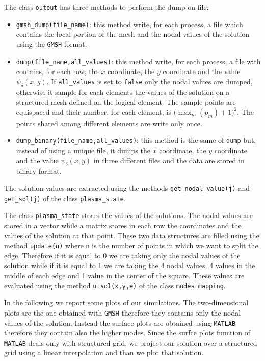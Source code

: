 The class \verb|output| has three methods to perform the dump on file:
\begin{itemize}
  \item \verb|gmsh_dump(file_name)|: this method write, for each process, a file which contains the local portion of the mesh and the nodal values of the solution using the \verb|GMSH| format.
  \item \verb|dump(file_name,all_values)|: this method write, for each process, a file with contains, for each row, the $x$ coordinate, the $y$ coordinate and the value $\psi_{\delta}(x,y)$. If \verb|all_values| is set to \verb|false| only the nodal values are dumped, otherwise it sample for each elements the values of the solution on a structured mesh defined on the logical element. The sample points are equispaced and their number, for each element, is $(\max_m(p_m)+1\big)^2$. The points shared among different elements are write only once.
  \item \verb|dump_binary(file_name,all_values)|: this method is the same of \verb|dump| but, instead of using a unique file, it dumps the $x$ coordinate, the $y$ coordinate and the value $\psi_{\delta}(x,y)$ in three different files and the data are stored in binary format.
\end{itemize}

The solution values are extracted using the methods \verb|get_nodal_value(j)| and \verb|get_sol(j)| of the class \verb|plasma_state|.
\medskip

The class \verb|plasma_state| stores the values of the solutions. The nodal values are stored in a vector while a matrix stores in each row the coordinates and the values of the solution at that point. These two data structures are filled using the method \verb|update(n)| where \verb|n| is the number of points in which we want to split the edge. Therefore if it is equal to 0 we are taking only the nodal values of the solution while if it is equal to 1 we are taking the 4 nodal values, 4 values in the middle of each edge and 1 value in the center of the square. These values are evaluated using the method \verb|u_sol(x,y,e)| of the class \verb|modes_mapping|.
\medskip

In the following we report some plots of our simulations. The two-dimensional plots are the one obtained with \verb|GMSH| therefore they contains only the nodal values of the solution. Instead the surface plots are obtained using \verb|MATLAB| therefore they contain also the higher modes. Since the surfce plots function of \verb|MATLAB| deals only with structured grid, we project our solution over a structured grid using a linear interpolation and than we plot that solution.

